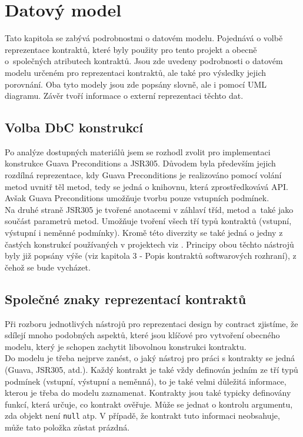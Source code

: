 \chapter{Datový model}
	Tato kapitola se zabývá podrobnostmi o datovém modelu. Pojednává o volbě reprezentace kontraktů, které byly použity pro tento projekt a obecně o~společných atributech kontraktů. Jsou zde uvedeny podrobnosti o datovém modelu určeném pro reprezentaci kontraktů, ale také pro výsledky jejich porovnání. Oba tyto modely jsou zde popsány slovně, ale i pomocí UML diagramu. Závěr tvoří informace o externí reprezentaci těchto dat.

	\section{Volba DbC konstrukcí}
		Po analýze dostupných materiálů jsem se rozhodl zvolit pro implementaci konstrukce Guava Preconditions a JSR305. Důvodem byla především jejich rozdílná reprezentace, kdy Guava Preconditions je realizováno pomocí volání metod uvnitř těl metod, tedy se jedná o knihovnu, která zprostředkovává API. Avšak Guava Preconditions umožňuje tvorbu pouze vstupních podmínek.\\
		
		 Na druhé straně JSR305 je tvořené anotacemi v záhlaví tříd, metod a~také jako součást parametrů metod. Umožňuje tvoření všech tří typů kontraktů (vstupní, výstupní i neměnné podmínky). Kromě této diverzity se také jedná o jedny z častých konstrukcí používaných v projektech viz \cite{contractsInWild}. Principy obou těchto nástrojů byly již popsány výše (viz kapitola 3 - Popis kontraktů softwarových rozhraní), z čehož se bude vycházet.
				
				
	\section{Společné znaky reprezentací kontraktů}		
		Při rozboru jednotlivých nástrojů pro reprezentaci design by contract zjistíme, že sdílejí mnoho podobných aspektů, které jsou klíčové pro vytvoření obecného modelu, který je schopen zachytit libovolnou konstrukci kontraktu.\\ 
		
		Do modelu je třeba nejprve zanést, o jaký nástroj pro práci s kontrakty se jedná (Guava, JSR305, atd.). Každý kontrakt je také vždy definován jedním ze tří typů podmínek (vstupní, výstupní a neměnná), to je také velmi důležitá informace, kterou je třeba do modelu zaznamenat. Kontrakty jsou také typicky definovány funkcí, která určuje, co kontrakt ověřuje. Může se jednat o kontrolu argumentu, zda objekt není \texttt{null} atp. V případě, že kontrakt tuto informaci neobsahuje, může tato položka zůstat prázdná.\\
		
